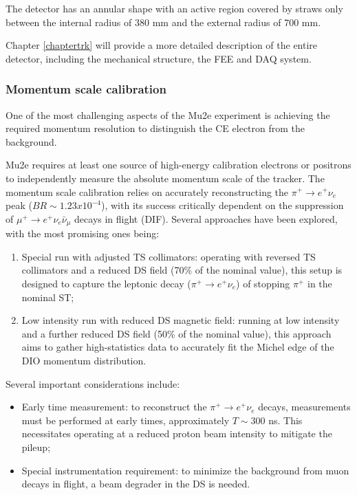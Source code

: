 The detector has an annular shape with an active region covered by straws only between the 
internal radius of 380 mm and the external radius of 700 mm.  

Chapter \ref{chaptertrk} will provide a more detailed description of the entire detector, 
including the mechanical structure, the FEE and 
DAQ system.
\subsubsection{Momentum scale calibration}
One of the most challenging aspects of the Mu2e experiment is achieving the 
required momentum resolution to distinguish the CE electron from the background.

Mu2e requires at least one source of high-energy calibration electrons or 
positrons to independently measure the absolute momentum scale of the tracker. 
The momentum scale calibration relies on accurately reconstructing the 
$\pi^+ \rightarrow e^+ \nu_e$ peak ($BR\sim 1.23x10^{-4}$), with its success critically dependent on the 
suppression of $\mu^+ \rightarrow e^+ \nu_e \bar{\nu}_\mu$ decays in flight (DIF). 
Several approaches have been explored, with the most promising ones being:

\begin{enumerate}
    \item Special run with adjusted TS collimators: operating with 
    reversed TS collimators and a reduced DS field 
    (70\% of the nominal value), this setup is designed to capture the 
    leptonic decay ($\pi^+ \rightarrow e^+ \nu_e$) of stopping $\pi^+$ in the nominal ST;
    
    \item Low intensity run with reduced DS magnetic field: 
    running at low intensity and a further reduced DS field 
    (50\% of the nominal value), 
    this approach aims to gather high-statistics data to accurately fit 
    the Michel edge of the DIO momentum distribution.
\end{enumerate}

Several important considerations include:

\begin{itemize}
    \item Early time measurement: to reconstruct the $\pi^+ \rightarrow e^+ \nu_e$ decays, 
    measurements must be performed at early times, approximately 
    $T \sim 300$ ns. This necessitates operating at a reduced proton 
    beam intensity to mitigate the pileup;
    
    \item Special instrumentation requirement: to minimize 
      the background from muon decays in flight, a beam degrader
      in the DS is needed.
\end{itemize}

